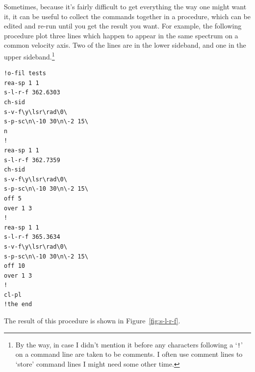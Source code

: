 \documentclass[11pt,twoside]{article}
\begin{document}
Sometimes, because it's fairly difficult to get everything the way one
might want it, it can be useful to collect the commands together in a
procedure, which can be edited and re-run until you get the result you
want. For example, the following procedure plot three lines which
happen to appear in the same spectrum on a common velocity axis. Two
of the lines are in the lower sideband, and one in the upper
sideband.\footnote{By the way, in case I didn't mention it before
any characters following a `{\tt{!}}' on a command line are taken to be
comments. I often use comment lines to `store' command lines I might need
some other time.}

\begin{verbatim}
!o-fil tests
rea-sp 1 1
s-l-r-f 362.6303
ch-sid
s-v-f\y\lsr\rad\0\
s-p-sc\n\-10 30\n\-2 15\
n
!
rea-sp 1 1
s-l-r-f 362.7359
ch-sid
s-v-f\y\lsr\rad\0\
s-p-sc\n\-10 30\n\-2 15\
off 5
over 1 3
!
rea-sp 1 1
s-l-r-f 365.3634
s-v-f\y\lsr\rad\0\
s-p-sc\n\-10 30\n\-2 15\
off 10
over 1 3
!
cl-pl
!the end
\end{verbatim}

The result of this procedure is shown in Figure~\ref{fig:s-l-r-f}.
\end{document}
